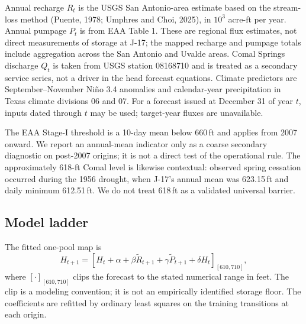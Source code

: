 \documentclass[11pt]{article}
\begin{document}
Annual recharge \(R_t\) is the USGS San Antonio-area estimate based on the stream-loss method (Puente, 1978; Umphres and Choi, 2025), in \(10^3\) acre-ft per year. Annual pumpage \(P_t\) is from EAA Table 1. These are regional flux estimates, not direct measurements of storage at J-17; the mapped recharge and pumpage totals include aggregation across the San Antonio and Uvalde areas. Comal Springs discharge \(Q_t\) is taken from USGS station 08168710 and is treated as a secondary service series, not a driver in the head forecast equations. Climate predictors are September--November Niño 3.4 anomalies and calendar-year precipitation in Texas climate divisions 06 and 07. For a forecast issued at December 31 of year \(t\), inputs dated through \(t\) may be used; target-year fluxes are unavailable.

The EAA Stage-I threshold is a 10-day mean below 660\,ft and applies from 2007 onward. We report an annual-mean indicator only as a coarse secondary diagnostic on post-2007 origins; it is not a direct test of the operational rule. The approximately 618-ft Comal level is likewise contextual: observed spring cessation occurred during the 1956 drought, when J-17's annual mean was 623.15\,ft and daily minimum 612.51\,ft. We do not treat 618\,ft as a validated universal barrier.

\subsection{Model ladder}

The fitted one-pool map is
\begin{equation}\label{eq:pool}
H_{t+1}=\left[H_t+\alpha+\beta\widetilde R_{t+1}+\gamma\widetilde P_{t+1}+\delta H_t\right]_{[610,710]},
\end{equation}
where \([\cdot]_{[610,710]}\) clips the forecast to the stated numerical range in feet. The clip is a modeling convention; it is not an empirically identified storage floor. The coefficients are refitted by ordinary least squares on the training transitions at each origin.
\end{document}
